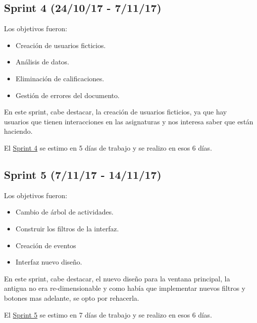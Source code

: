 
\subsection{Sprint 4 (24/10/17 -
	7/11/17)}\label{sprint-4-241017---071117}

Los objetivos fueron:
\begin{itemize}
	\tightlist
	\item
	Creación de usuarios ficticios.
	\item
	Análisis de datos.
	\item
	Eliminación de calificaciones.	
	\item
	Gestión de errores del documento.
	
\end{itemize}

En este sprint, cabe destacar, la creación de usuarios ficticios, ya que hay usuarios que tienen interacciones en las asignaturas y nos interesa saber que están haciendo.

El \href{https://github.com/trona85/GII-17.1B-UBULog-1.0/milestone/4?closed=1}{Sprint 4} se estimo en 5 días de trabajo y se realizo en esos 6 días.


\subsection{Sprint 5 (7/11/17 -
	14/11/17)}\label{sprint-5-071117---141117}

Los objetivos fueron:
\begin{itemize}
	\tightlist
	\item
	Cambio de árbol de actividades.
	\item
	Construir los filtros de la interfaz.
	\item
	Creación de eventos	
	\item
	Interfaz nuevo diseño.
	
\end{itemize}

En este sprint, cabe destacar, el nuevo diseño para la ventana principal, la antigua no era re-dimensionable y como había que implementar nuevos filtros y botones mas adelante, se opto por rehacerla.

El \href{https://github.com/trona85/GII-17.1B-UBULog-1.0/milestone/5?closed=1}{Sprint 5} se estimo en 7 días de trabajo y se realizo en esos 6 días.



